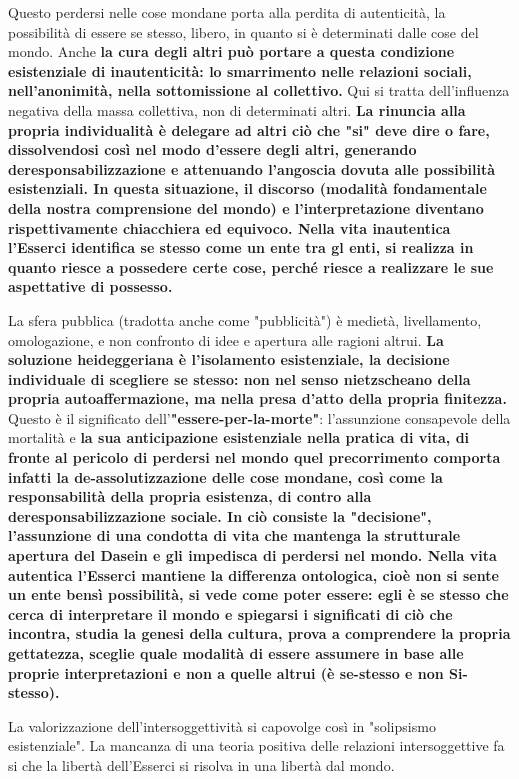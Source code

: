 Questo perdersi nelle cose mondane porta alla perdita di
autenticità, la possibilità di essere se stesso, libero,
in quanto si è determinati dalle cose del mondo.
Anche \textbf{la cura degli altri può portare a questa
condizione esistenziale di inautenticità: lo
smarrimento nelle relazioni sociali, nell'anonimità,
nella sottomissione al collettivo.} Qui si tratta
dell'influenza negativa della massa collettiva,
non di determinati altri. \textbf{La rinuncia alla
propria individualità è delegare ad altri ciò
che "si" deve dire o fare, dissolvendosi così nel
modo d'essere degli altri, generando
deresponsabilizzazione e attenuando l'angoscia dovuta alle possibilità esistenziali. In questa situazione,
il discorso (modalità fondamentale della nostra
comprensione del mondo) e l'interpretazione diventano rispettivamente chiacchiera ed equivoco. Nella vita inautentica l'Esserci identifica se stesso come  un ente tra gl enti, si realizza in quanto riesce a possedere certe cose, perché riesce a realizzare le sue aspettative di possesso.}

La sfera pubblica (tradotta anche come "pubblicità") è
medietà, livellamento, omologazione, e non confronto
di idee e apertura alle ragioni altrui.
\textbf{La soluzione heideggeriana è l'isolamento
esistenziale, la decisione individuale di
scegliere se stesso: non nel senso nietzscheano
della propria autoaffermazione, ma nella presa
d'atto della propria finitezza.} Questo è il
significato dell'\textbf{"essere-per-la-morte"}: l'assunzione
consapevole della mortalità e \textbf{la sua anticipazione
esistenziale nella pratica di vita, di fronte al
pericolo di perdersi nel mondo quel precorrimento
comporta infatti la de-assolutizzazione delle cose
mondane, così come la responsabilità della propria
esistenza, di contro alla deresponsabilizzazione
sociale. In ciò consiste la "decisione", l'assunzione di una condotta di vita che mantenga
la strutturale apertura del Dasein e gli impedisca
di perdersi nel mondo. Nella vita autentica l'Esserci mantiene la differenza ontologica, cioè non si sente un ente bensì possibilità, si vede come poter essere: egli è se stesso che cerca di interpretare il mondo e spiegarsi i significati di ciò che incontra, studia la genesi della cultura, prova a comprendere la propria gettatezza, sceglie quale modalità di essere assumere in base alle proprie interpretazioni e non a quelle altrui (è se-stesso e non Si-stesso).}

 La valorizzazione dell'intersoggettività si capovolge così in
"solipsismo esistenziale". 
La mancanza di una
teoria positiva delle relazioni intersoggettive
fa si che la libertà dell'Esserci si risolva in
una libertà dal mondo.


